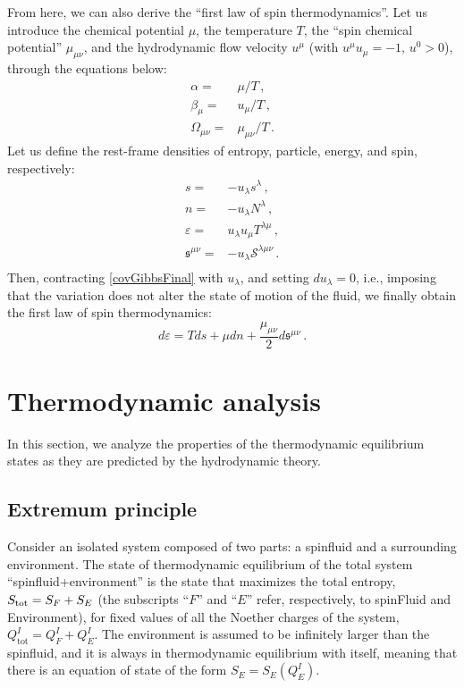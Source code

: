 \documentclass[12pt,aps,prd,nofootinbib,noshowkeys,noshowpacs,longbibliography,
superscriptaddress,tightenlines,floatfix,preprintnumbers]{revtex4-2}
\begin{document}
From here, we can also derive the ``first law of spin thermodynamics''. Let us introduce the chemical potential $\mu$, the temperature $T$, the ``spin chemical potential'' $\mu_{\mu \nu}$, and the hydrodynamic flow velocity $u^\mu$ (with $u^\mu u_\mu=-1$, $u^0>0$), through the equations below:
\begin{equation}
    \begin{split}
        \alpha ={}& \mu/T \, ,\\
        \beta_{\mu} ={}& u_\mu/T \, , \\
        \Omega_{\mu \nu} ={}& \mu_{\mu \nu}/T \, .
    \end{split}
\end{equation}
Let us define the rest-frame densities of entropy, particle, energy, and spin, respectively:
\begin{equation}
    \begin{split}
        s={}& -u_\lambda s^\lambda \, , \\
        n={}& -u_\lambda N^\lambda \, , \\
        \varepsilon ={}& u_\lambda u_\mu T^{\lambda\mu} \, , \\
        \mathfrak{s}^{\mu \nu}={}& -u_\lambda \mathcal{S}^{\lambda \mu \nu} \, . \\
    \end{split}
\end{equation}
Then, contracting \eqref{covGibbsFinal} with $u_\lambda$, and setting $du_\lambda=0$, i.e., imposing that the variation does not alter the state of motion of the fluid, we finally obtain the first law of spin thermodynamics:
\begin{equation}
d\varepsilon = T ds +\mu dn + \dfrac{\mu_{\mu \nu}}{2} d\mathfrak{s}^{\mu \nu}  \, .
\end{equation}
\section{Thermodynamic analysis}\label{sec:thermodynamicanalysis}
%
In this section, we analyze the properties of the thermodynamic equilibrium states as they are predicted by the hydrodynamic theory. 
%
\subsection{Extremum principle}\label{extremumprinciple}
Consider an isolated system composed of two parts: a spinfluid and a surrounding environment. The state of thermodynamic equilibrium of the total system ``spinfluid+environment'' is the state that maximizes the total entropy, $S_{\rm tot}=S_F+S_E$ 
(the subscripts ``$F$'' and ``$E$'' refer, respectively, to spinFluid and Environment), for fixed values of all the Noether charges of the system, $Q_{\text{tot}}^I=Q^I_F+Q_E^I$. The environment is assumed to be infinitely larger than the spinfluid, and it is always in thermodynamic equilibrium with itself, meaning that there is an equation of state of the form $S_E=S_E(Q_E^I)$. 
\end{document}
